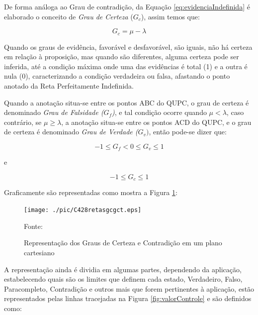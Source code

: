 De forma análoga ao Grau de contradição, da Equação \ref{eq:evidenciaIndefinida} é elaborado o conceito de \emph{Grau de Certeza} ($G _c$), assim temos que: 

\begin{center}
\begin{equation}
G _{c} = \mu - \lambda
\label{eq:grauCerteza}
\end{equation}
\end{center}

Quando os graus de evidência, favorável e desfavorável, são iguais, não há certeza em relação à proposição, mas quando são diferentes, alguma certeza pode ser inferida, até a condição máxima onde uma das evidências é total (1) e a outra é nula (0), caracterizando a condição verdadeira ou falsa, afastando o ponto anotado da Reta Perfeitamente Indefinida. 

Quando a anotação situa-se entre os pontos ABC do QUPC, o grau de certeza é denominado \emph{Grau de Falsidade ($G _f$)}, e tal condição ocorre quando $\mu < \lambda $, caso contrário, se $\mu \ge \lambda $, a anotação situa-se entre os pontos ACD do QUPC, e o grau de certeza é denominado \emph{Grau de Verdade ($G _v)$}, então pode-se dizer que:

\begin{center}
\begin{equation}
-1 \le G _{f}  <  0 \le G _{v} \le 1
\label{eq:grauVerdadeFalsidade}
\end{equation}
\end{center}
e
\begin{center}
\begin{equation}
-1 \le G _{c} \le 1
\label{eq:grauCertezaIntervalo}
\end{equation}
\end{center}


Graficamente são representadas como mostra a Figura \ref{fig:retasgcgct}:

\begin{figure}[!htb]
\centering
\caption{Representação dos Graus de Certeza e Contradição em um plano cartesiano}
\center\texttt{[image: ./pic/C428retasgcgct.eps]}
\label{fig:retasgcgct}

{\small Fonte: \cite{JoaoInacio}}
\end{figure}

A representação ainda é dividia em algumas partes, dependendo da aplicação, estabelecendo quais são os limites que definem cada estado, Verdadeiro, Falso, Paracompleto, Contradição e outros mais que forem pertinentes à aplicação, estão representados pelas linhas tracejadas na Figura \ref{fig:valorControle} e são definidos como:

